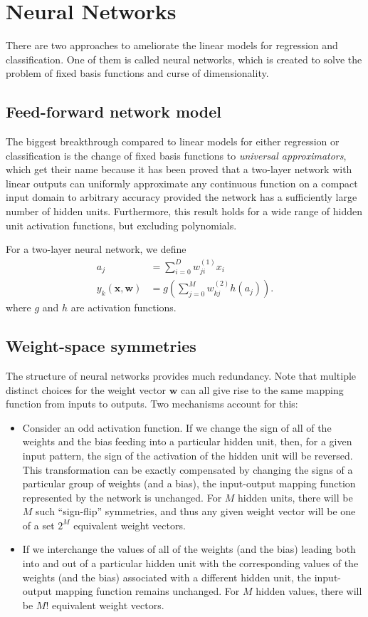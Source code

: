 \documentclass[a4paper]{book}
\renewcommand{\bf}{\mathbf}
\newcommand{\imp}[1]{\textit{#1}}
\begin{document}
\section{Neural Networks}
There are two approaches to ameliorate the linear models for regression and classification. One of them is called neural networks, which is created to solve the problem of fixed basis functions and curse of dimensionality. 

\subsection{Feed-forward network model}
The biggest breakthrough compared to linear models for either regression or classification is the change of fixed basis functions to \imp{universal approximators}, which get their name because it has been proved that a two-layer network with linear outputs can uniformly approximate any continuous function on a compact input domain to arbitrary accuracy provided the network has a sufficiently large number of hidden units. Furthermore, this result holds for a wide range of hidden unit activation functions, but excluding polynomials.

For a two-layer neural network, we define
\begin{align}
	a_j &= \sum_{i=0} ^D w_{ji}^{(1)} x_i \\
	y_k(\bf{x,w}) &= g\left( \sum_{j=0}^M w_{kj}^{(2)} h(a_j) \right).
\end{align}
where $g$ and $h$ are activation functions.

\subsection{Weight-space symmetries}
The structure of neural networks provides much redundancy. Note that multiple distinct choices for the weight vector $\bf{w}$ can all give rise to the same mapping function from inputs to outputs. Two mechanisms account for this:
\begin{itemize}
	\item Consider an odd activation function. If we change the sign of all of the weights and the bias feeding into a particular hidden unit, then, for a given input pattern, the sign of the activation of the hidden unit will be reversed. This transformation can be exactly compensated by changing the signs of a particular group of weights (and a bias), the input-output mapping function represented by the network is unchanged. For $M$ hidden units, there will be $M$ such ``sign-flip'' symmetries, and thus any given weight vector will be one of a set $2^M$ equivalent weight vectors.
	\item If we interchange the values of all of the weights (and the bias) leading both into and out of a particular hidden unit with the corresponding values of the weights (and the bias) associated with a different hidden unit, the input-output mapping function remains unchanged. For $M$ hidden values, there will be $M!$ equivalent weight vectors.
\end{itemize}
\end{document}
